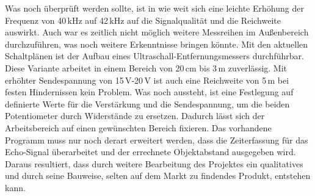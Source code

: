 Was noch überprüft werden sollte, ist in wie weit sich eine leichte Erhöhung der Frequenz von 40\,kHz auf 42\,kHz auf die Signalqualität und die Reichweite auswirkt. Auch war es zeitlich nicht möglich weitere Messreihen im Außenbereich durchzuführen, was noch weitere Erkenntnisse bringen könnte. Mit den aktuellen Schaltplänen ist der Aufbau eines Ultraschall-Entfernungsmessers durchführbar. Diese Variante arbeitet in einem Bereich von 20\,cm bis 3\,m zuverlässig. Mit erhöhter Sendespannung von 15\,V-20\,V ist auch eine Reichweite von 5\,m bei festen Hindernissen kein Problem. Was noch aussteht, ist eine Festlegung auf definierte Werte für die Verstärkung und die Sendespannung, um die beiden Potentiometer durch Widerstände zu ersetzen. Dadurch lässt sich der Arbeitsbereich auf einen gewünschten Bereich fixieren. Das vorhandene Programm muss nur noch derart erweitert werden, dass die Zeiterfassung für das Echo-Signal überarbeitet und der errechnete Objektabstand ausgegeben wird. Daraus resultiert, dass durch weitere Bearbeitung des Projektes ein qualitatives und durch seine Bauweise, selten auf dem Markt zu findendes Produkt, entstehen kann.
